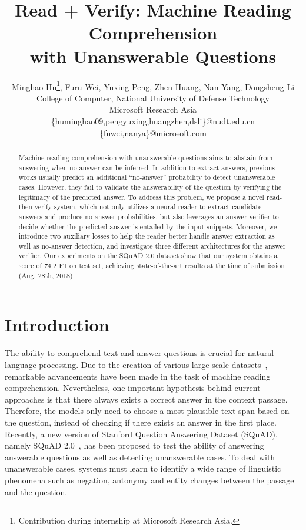 \documentclass[letterpaper]{article} \usepackage{aaai19}  \usepackage{times}  \usepackage{helvet}  \usepackage{courier}  \usepackage{url}  \usepackage{graphicx}  \usepackage{pbox}
\begin{document}
\title{Read + Verify: Machine Reading Comprehension \\ with Unanswerable Questions}
\author{
Minghao Hu\thanks{Contribution during internship at Microsoft Research Asia.}, 
Furu Wei, 
Yuxing Peng, 
Zhen Huang, 
Nan Yang,
Dongsheng Li
\\ 
College of Computer, National University of Defense Technology  \\
Microsoft Research Asia   \\
\{huminghao09,pengyuxing,huangzhen,dsli\}@nudt.edu.cn \\
\{fuwei,nanya\}@microsoft.com
}
\maketitle

\begin{abstract}
Machine reading comprehension with unanswerable questions aims to abstain from answering when no answer can be inferred.
In addition to extract answers, previous works usually predict an additional ``no-answer'' probability to detect unanswerable cases.
However, they fail to validate the answerability of the question by verifying the legitimacy of the predicted answer.
To address this problem, we propose a novel read-then-verify system, which not only utilizes a neural reader to extract candidate answers and produce no-answer probabilities, but also leverages an answer verifier to decide whether the predicted answer is entailed by the input snippets.
Moreover, we introduce two auxiliary losses to help the reader better handle answer extraction as well as no-answer detection, and investigate three different architectures for the answer verifier.
Our experiments on the SQuAD 2.0 dataset show that our system obtains a score of 74.2 F1 on test set, achieving state-of-the-art results at the time of submission (Aug. 28th, 2018).
\end{abstract}
 \section{Introduction}
The ability to comprehend text and answer questions is crucial for natural language processing.
Due to the creation of various large-scale datasets~\cite{Hermann15,Nguyen16,Joshi17,Kovcisky18}, remarkable advancements have been made in the task of machine reading comprehension.
Nevertheless, one important hypothesis behind current approaches is that there always exists a correct answer in the context passage. 
Therefore, the models only need to choose a most plausible text span based on the question, instead of checking if there exists an answer in the first place.  
Recently, a new version of Stanford Question Answering Dataset (SQuAD), namely SQuAD 2.0~\cite{Rajpurkar18}, has been proposed to test the ability of answering answerable questions as well as detecting unanswerable cases.
To deal with unanswerable cases, systems must learn to identify a wide range of linguistic phenomena such as negation, antonymy and entity changes between the passage and the question.
\end{document}
